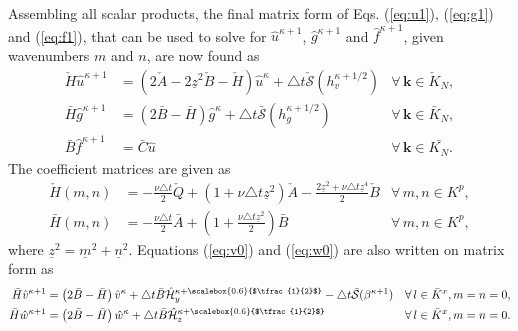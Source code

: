 \documentclass[preprint]{elsarticle}
\newcommand*{\Scale}[2][4]{\scalebox{#1}{$#2$}}%
\newcommand{\half}{\Scale[0.6]{\tfrac{1}{2}}}
\newcommand{\N}[1]{\check{#1}}
\newcommand{\D}[1]{\bar{#1}}
\begin{document}
Assembling all scalar products, the final matrix form of Eqs. (\ref{eq:u1}), (\ref{eq:g1}) and (\ref{eq:f1}), that can be used to solve for $\hat{u}^{{\kappa}+1}$, $\hat{g}^{{\kappa}+1}$ and $\hat{f}^{\kappa+1}$,
given wavenumbers $m$ and $n$, are now found as
\begin{align}
\N{H}\hat{u}^{{\kappa}+1} & = \left(2\N{A} - 2\underline{z}^2\N{B} - \N{H} 
\right)\hat{u}^{{\kappa}} + \triangle t \N{\mathcal{S}}(h_v^{{\kappa}+1/2})  & 
\forall \, {\bm{k}} \in \N{K}_N, 
\label{eq:ufin}\\ 
\D{H} \hat{g}^{{\kappa}+1} &= \left(2 \D{B}-\D{H}\right) 
\hat{g}^{{\kappa}} + \triangle t \D{\mathcal{S}}(h_g^{{\kappa}+1/2})  &\forall \, 
{\bm{k}} \in 
\D{K}_N, \label{eq:gfin} \\
\D{B} \hat{f}^{\kappa+1} &= \D{C}\hat{u} &\forall \, \bm{k} \in \D{K_N}. \label{eq:ffin}
\end{align}
The coefficient matrices are given as
\begin{align}
\N{H}(m, n) &= -\frac{\nu \triangle t}{2}\N{Q} + \left( 1 + \nu 
\triangle t 
\underline{z}^2 \right) \N{A} - \frac{2\underline{z}^2 + \nu \triangle t 
\underline{z}^4}{2} \N{B} &\forall \, m, n \in K^p, 
\label{eq:Biharmonic_matrix} \\
\D{H}(m, n) &= -\frac{\nu \triangle 
t}{2}\D{A} + (1 + \frac{\nu \triangle t \underline{z}^2}{2}) \D{B} 
&\forall \, m, n \in K^p, \label{eq:Helmholtz_matrix}
\end{align}
where $\underline{z}^2 = \underline{m}^2 + \underline{n}^2$. Equations 
(\ref{eq:v0}) and (\ref{eq:w0}) are also written on matrix form as
\begin{align}
\D{H}\hat{v}^{{\kappa}+1} &= 
\left(2\D{B} - \D{H} \right)\hat{v}^{{\kappa}} + \triangle t\D{B}\hat{\mathcal{H}}_{y}^{{\kappa}+\half} - \triangle t \D{\mathcal{S}}(\beta^{\kappa+1}) & \forall \, l \in \D{K}^x, m=n=0, 
\label{eq:v00} \\
\D{H}\hat{w}^{{\kappa}+1} &= 
\left(2\D{B} - \D{H} \right)\hat{w}^{{\kappa}} + \triangle t\D{B}\hat{\mathcal{H}}_{z}^{{\kappa}+\half} & \forall \, l \in \D{K}^x, m=n=0. 
\label{eq:w00}
\end{align}
\end{document}
